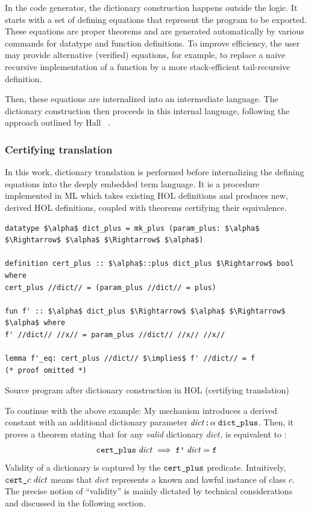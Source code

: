 In the code generator, the dictionary construction happens outside the logic.
It starts with a set of defining equations that represent the program to be exported.
These equations are proper theorems and are generated automatically by various commands for datatype and function definitions.
To improve efficiency, the user may provide alternative (verified) equations, for example, to replace a naive recursive implementation of a function by a more stack-efficient tail-recursive definition.

Then, these equations are internalized into an intermediate language.
The dictionary construction then proceeds in this internal language, following the approach outlined by Hall \etal~\cite{hall1996classes}.

\subsubsection{Certifying translation}
\label{sec:preproc:dict:elim:cert}

In this work, dictionary translation is performed before internalizing the defining equations into the deeply embedded term language.
It is a procedure implemented in ML which takes existing HOL definitions and produces new, derived HOL definitions, coupled with theorems certifying their equivalence.

\begin{code}
  \begin{lstlisting}[language=Isabelle]
datatype $\alpha$ dict_plus = mk_plus (param_plus: $\alpha$ $\Rightarrow$ $\alpha$ $\Rightarrow$ $\alpha$)

definition cert_plus :: $\alpha$::plus dict_plus $\Rightarrow$ bool where
cert_plus //dict// = (param_plus //dict// = plus)

fun f' :: $\alpha$ dict_plus $\Rightarrow$ $\alpha$ $\Rightarrow$ $\alpha$ where
f' //dict// //x// = param_plus //dict// //x// //x//

lemma f'_eq: cert_plus //dict// $\implies$ f' //dict// = f
(* proof omitted *)
  \end{lstlisting}
  \caption{Source program after dictionary construction in HOL (certifying translation)}
  \label{code:preproc:dict:hol}
\end{code}

To continue with the above example:
My mechanism introduces a derived constant  with an additional dictionary parameter $\mathit{dict} \mathbin{:\!\!:} \alpha\;\texttt{\textup{dict\_plus}}$.
Then, it proves a theorem stating that for any \emph{valid} dictionary $\mathit{dict}$,  is equivalent to :
\[ \texttt{\textup{cert\_plus}}\;\mathit{dict} \implies \texttt{\textup{f'}}\;\mathit{dict} = \texttt{\textup{f}} \]
Validity of a dictionary is captured by the $\texttt{\textup{cert\_plus}}$ predicate.
Intuitively, $\texttt{\textup{cert\_}}c\;\mathit{dict}$ means that $\mathit{dict}$ represents a known and lawful instance of class $c$.
The precise notion of ``validity'' is mainly dictated by technical considerations and discussed in the following section.

